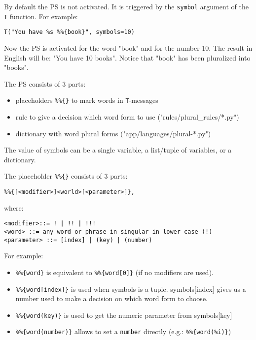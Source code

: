 \documentclass[justified,sixbynine,notoc]{tufte-book}
\def\ft{\small\tt}
\begin{document}
\begin{fullwidth}
By default the PS is not activated. It is triggered by the {\ft symbol} argument of the {\ft T} function. For example:

\begin{lstlisting}
T("You have %s %%{book}", symbols=10)
\end{lstlisting}

Now the PS is activated for the word "book" and for the number 10.
The result in English will be: "You have 10 books". Notice that "book" has been pluralized into "books".

The PS consists of 3 parts:
\begin{itemize}
\item placeholders {\ft \%\%\{\}} to mark words in {\ft T}-messages

\item rule to give a decision which word form to use ("rules/plural\_rules/*.py")

\item dictionary with word plural forms ("app/languages/plural-*.py")
\end{itemize}

The value of symbols can be a single variable, a list/tuple of variables, or a dictionary.

The placeholder {\ft \%\%\{\}} consists of 3 parts:

\begin{lstlisting}
%%{[<modifier>]<world>[<parameter>]},
\end{lstlisting}
\noindent where:

\begin{lstlisting}[keywords={}]
<modifier>::= ! | !! | !!!
<word> ::= any word or phrase in singular in lower case (!)
<parameter> ::= [index] | (key) | (number)
\end{lstlisting}

For example:

\begin{itemize}
\item {\ft \%\%\{word\}} is equivalent to {\ft \%\%\{word[0]\}} (if no modifiers are used).

\item {\ft \%\%\{word[index]\}} is used when symbols is a tuple. symbols[index] gives us a number used to make a decision on which word form to choose.

\item {\ft \%\%\{word(key)\}} is used to get the numeric parameter from symbols[key]

\item {\ft \%\%\{word(number)\}} allows to set a {\ft number} directly (e.g.: {\ft \%\%\{word(\%i)\}})


\end{itemize}
\end{fullwidth}
\end{document}
